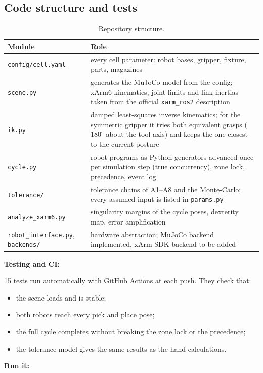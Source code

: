 \documentclass[11pt,a4paper]{article}
\newcommand{\code}[1]{\texttt{#1}}
\begin{document}
\subsection{Code structure and tests}

\begin{table}[H]
\centering
\caption{Repository structure.}
\begin{tabularx}{\textwidth}{@{}l L@{}}
\toprule
Module & Role\\
\midrule
\code{config/cell.yaml} & every cell parameter: robot bases, gripper, fixture, parts, magazines\\
\code{scene.py} & generates the MuJoCo model from the config; xArm6 kinematics, joint limits and
link inertias taken from the official \code{xarm\_ros2} description\\
\code{ik.py} & damped least-squares inverse kinematics; for the symmetric gripper it tries both
equivalent grasps ($180^\circ$ about the tool axis) and keeps the one closest to the current
posture\\
\code{cycle.py} & robot programs as Python generators advanced once per simulation step (true
concurrency), zone lock, precedence, event log\\
\code{tolerance/} & tolerance chains of A1--A8 and the Monte-Carlo; every assumed input is listed
in \code{params.py}\\
\code{analyze\_xarm6.py} & singularity margins of the cycle poses, dexterity map, error
amplification\\
\code{robot\_interface.py}, \code{backends/} & hardware abstraction; MuJoCo backend implemented,
xArm SDK backend to be added\\
\bottomrule
\end{tabularx}
\end{table}

\textbf{Testing and CI:}

15 tests run automatically with GitHub Actions at each push. They check that:
\begin{itemize}
  \item the scene loads and is stable;
  \item both robots reach every pick and place pose;
  \item the full cycle completes without breaking the zone lock or the precedence;
  \item the tolerance model gives the same results as the hand calculations.
\end{itemize}

\textbf{Run it:}
\end{document}
